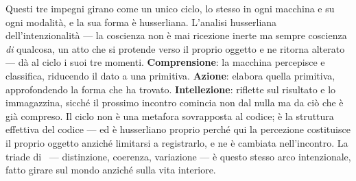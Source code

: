 Questi tre impegni girano come un unico ciclo, lo stesso in ogni macchina e su
ogni modalit\`a, e la sua forma \`e husserliana. L'analisi husserliana
dell'intenzionalit\`a --- la coscienza non \`e mai ricezione inerte ma sempre
coscienza \emph{di} qualcosa, un atto che si protende verso il proprio oggetto e
ne ritorna alterato --- d\`a al ciclo i suoi tre momenti. \textbf{Comprensione}: la
macchina percepisce e classifica, riducendo il dato a una primitiva.
\textbf{Azione}: elabora quella primitiva, approfondendo la forma che ha trovato.
\textbf{Intellezione}: riflette sul risultato e lo immagazzina, sicch\'e il
prossimo incontro comincia non dal nulla ma da ci\`o che \`e gi\`a compreso. Il
ciclo non \`e una metafora sovrapposta al codice; \`e la struttura effettiva del
codice --- ed \`e husserliano proprio perch\'e qui la percezione costituisce il
proprio oggetto anzich\'e limitarsi a registrarlo, e ne \`e cambiata
nell'incontro. La triade di \physis\ --- distinzione, coerenza, variazione --- \`e
questo stesso arco intenzionale, fatto girare sul mondo anzich\'e sulla vita
interiore.

